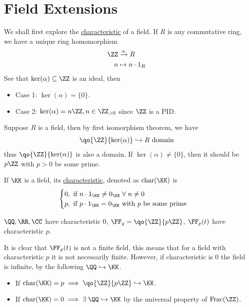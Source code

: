 \section{Field Extensions}
We shall first explore the \underline{characteristic} of a field. If \( R \) is any commutative
ring, we have a unique ring homomorphism
\[
	\begin{aligned}
		\ZZ & \xrightarrow{\alpha} R \\
		n   & \mapsto n \cdot 1_R
	\end{aligned}
\]
See that \( \ker(\alpha) \subseteq \ZZ \) is an ideal, then
\begin{itemize}
	\item Case 1: \( \ker(\alpha) = \{0\} \).
	\item Case 2: \( \ker(\alpha) = n \ZZ, n \in \ZZ_{>0} \) since \( \ZZ \) is a PID.
\end{itemize}
Suppose \( R \) is a field, then by first isomorphism theorem, we have
\[
	\qo{\ZZ}{\ker(\alpha)} \hookrightarrow R \text{ domain}
\]
thus \( \qo{\ZZ}{\ker(\alpha)} \) is also a domain. If \( \ker(\alpha)  \ne \{0\}\), then it should
be \( p\ZZ \) with \( p> 0 \) be some prime.

\begin{definition}
	If \( \KK \) is a field, its \underline{characteristic}, denoted as \( \text{char}(\KK) \) is
	\[
		\begin{cases}
			0, \text{ if } n \cdot 1_\KK \ne 0_\KK \; \forall \; n \ne 0 \\
			p, \text{ if } p \cdot 1_\KK = 0_\KK \text{ with } p \text{ be some prime}
		\end{cases}
	\]
\end{definition}

\begin{eg}
	\( \QQ,\RR,\CC \) have characteristic \( 0 \), \( \FF_q = \qo{\ZZ}{p\ZZ} \), \( \FF_p(t) \) have
	characteristic \( p \).
\end{eg}

\begin{note}
	It is clear that \( \FF_p(t) \) is not a finite field, this means that for a field with
	characteristic \( p \) it is not necessarily finite. However, if characteristic is \( 0 \) the
	field is infinite, by the following \( \QQ \hookrightarrow \KK \).
\end{note}

\begin{note}
	\leavevmode
	\begin{itemize}
		\item If \( \text{char}(\KK) = p \implies \qo{\ZZ}{p\ZZ} \hookrightarrow \KK \).
		\item If \( \text{char}(\KK) = 0 \implies \exists \; \QQ \hookrightarrow \KK\) by the universal
		      property of \( \text{Frac}(\ZZ) \).
	\end{itemize}
\end{note}

